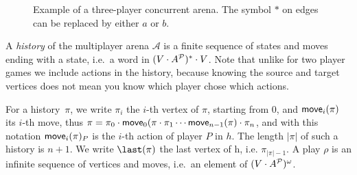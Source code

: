 \begin{figure}
\begin{center}
    \caption{Example of a three-player concurrent arena.
      The symbol $\ast$ on edges can be replaced by either $a$ or $b$.}
    \label{14-fig:example1}
  \end{center}
\end{figure}


A \emph{history} of the multiplayer arena
\({\mathcal A}\) is a finite sequence of states and moves ending with a
state, i.e.~a word in \((V \cdot A^{\mathcal{P}})^* \cdot V\). Note that unlike
for two player games we include actions in the history, because knowing
the source and target vertices does not mean you know which player chose
which actions.

For a history~$\pi$, we write \(\pi_i\) the $i$-th vertex of $\pi$, starting from $0$, and
\(\textsf{move}_i(\pi)\) its $i$-th move, thus
\(\pi = \pi_0 \cdot \textsf{move}_0(\pi \cdot \pi_1 \cdots \textsf{move}_{n-1}(\pi)\cdot \pi_n\), and
with this notation $\textsf{move}_i(\pi)_P$ is the $i$-th action of player $P$ in $h$.
The length $|\pi|$ of such a history is $n + 1$. We write
$\last(\pi)$ the last vertex of h, i.e. \(\pi_{|\pi|-1}\).
A play \(\rho\) is an
infinite sequence of vertices and moves, i.e.~an element of
\((V \cdot A^{\mathcal{P}})^\omega\).

